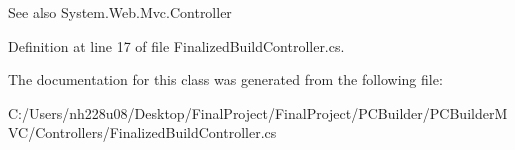 \begin{DoxySeeAlso}{See also}
System.\+Web.\+Mvc.\+Controller


\end{DoxySeeAlso}


Definition at line 17 of file Finalized\+Build\+Controller.\+cs.



The documentation for this class was generated from the following file\+:\begin{DoxyCompactItemize}
\item 
C\+:/\+Users/nh228u08/\+Desktop/\+Final\+Project/\+Final\+Project/\+P\+C\+Builder/\+P\+C\+Builder\+M\+V\+C/\+Controllers/Finalized\+Build\+Controller.\+cs\end{DoxyCompactItemize}
